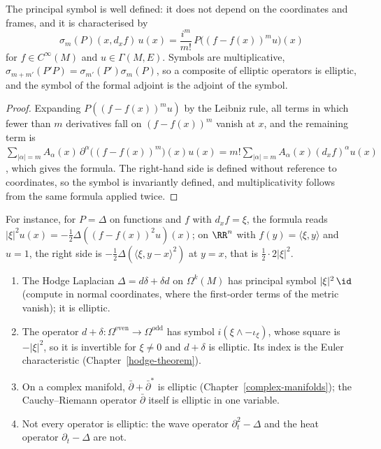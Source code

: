 \begin{proposition}\label{elliptic-operators:proposition-symbol}
The principal symbol is well defined: it does not depend on the coordinates and frames, and it is characterised by
\[
\sigma_m(P)(x, d_xf)\,u(x) = \frac{i^m}{m!}\,P\big((f - f(x))^mu\big)(x)
\]
for $f \in C^\infty(M)$ and $u \in \Gamma(M, E)$. Symbols are multiplicative, $\sigma_{m+m'}(P'P) = \sigma_{m'}(P')\sigma_m(P)$, so a composite of elliptic operators is elliptic, and the symbol of the formal
adjoint is the adjoint of the symbol.
\end{proposition}

\begin{proof}
Expanding $P((f - f(x))^mu)$ by the Leibniz rule, all terms in which fewer than $m$ derivatives fall on $(f - f(x))^m$ vanish at $x$, and the remaining term is
$\sum_{|\alpha| = m}A_\alpha(x)\,\partial^\alpha\big((f - f(x))^m\big)(x)u(x) = m!\sum_{|\alpha| = m}A_\alpha(x)(d_xf)^\alpha u(x)$, which gives the formula. The right-hand side is defined without reference to
coordinates, so the symbol is invariantly defined, and multiplicativity follows from the same formula applied twice.
\end{proof}

For instance, for $P = \Delta$ on functions and $f$ with $d_xf = \xi$, the formula reads $|\xi|^2u(x) = -\frac12\Delta((f - f(x))^2u)(x)$; on $\RR^n$ with $f(y) = \langle\xi, y\rangle$ and $u = 1$, the right
side is $-\frac12\Delta(\langle\xi, y - x\rangle^2)$ at $y = x$, that is $\frac12 \cdot 2|\xi|^2$.

\begin{example}\label{elliptic-operators:example-elliptic}
\begin{enumerate}
\item The Hodge Laplacian $\Delta = d\delta + \delta d$ on $\Omega^k(M)$ has principal symbol $|\xi|^2\,\id$ (compute in normal coordinates, where the first-order terms of the metric vanish); it is elliptic.
\item The operator $d + \delta \colon \Omega^{\mathrm{even}} \to \Omega^{\mathrm{odd}}$ has symbol $i(\xi \wedge - \iota_\xi)$, whose square is $-|\xi|^2$, so it is invertible for $\xi \neq 0$ and $d + \delta$ is
elliptic. Its index is the Euler characteristic (Chapter~\ref{hodge-theorem}).
\item On a complex manifold, $\bar\partial + \bar\partial^*$ is elliptic (Chapter~\ref{complex-manifolds}); the Cauchy--Riemann operator $\bar\partial$ itself is elliptic in one variable.
\item Not every operator is elliptic: the wave operator $\partial_t^2 - \Delta$ and the heat operator $\partial_t - \Delta$ are not.
\end{enumerate}
\end{example}

